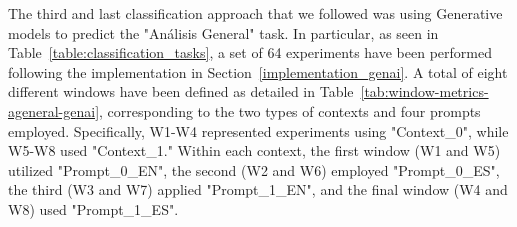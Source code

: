 
The third and last classification approach that we followed was using Generative models to predict the "Análisis General" task. In particular, as seen in Table~\ref{table:classification_tasks}, a set of 64 experiments have been performed following the implementation in Section~\ref{implementation_genai}. A total of eight different windows have been defined as detailed in Table~\ref{tab:window-metrics-ageneral-genai}, corresponding to the two types of contexts and four prompts employed. Specifically, W1-W4 represented experiments using "Context\_0", while W5-W8 used "Context\_1." Within each context, the first window (W1 and W5) utilized "Prompt\_0\_EN", the second (W2 and W6) employed "Prompt\_0\_ES", the third (W3 and W7) applied "Prompt\_1\_EN", and the final window (W4 and W8) used "Prompt\_1\_ES".


